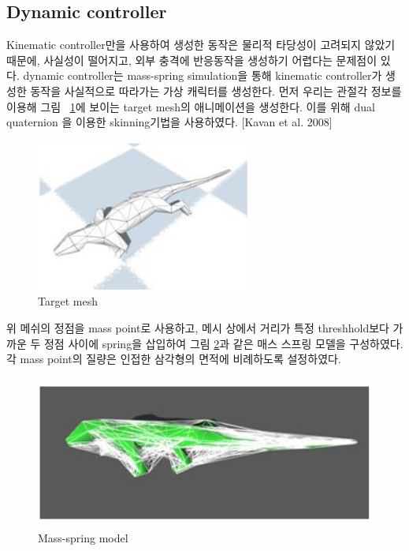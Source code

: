 \documentclass[11pt,a4paper]{article}
\begin{document}
\subsection{Dynamic controller}
Kinematic controller만을 사용하여 생성한 동작은 물리적 타당성이 고려되지 않았기 때문에, 사실성이 떨어지고, 외부 충격에 반응동작을 생성하기 어렵다는 문제점이 있다. dynamic controller는 mass-spring simulation을 통해 kinematic controller가 생성한 동작을 사실적으로 따라가는 가상 캐릭터를 생성한다. 먼저 우리는 관절각 정보를 이용해 그림 ~\ref{target}에 보이는 target mesh의 애니메이션을 생성한다. 이를 위해 dual quaternion 을 이용한 skinning기법을 사용하였다. [Kavan et al. 2008]
                             
\begin{figure}[h]
\center
\includegraphics[height=5cm]{figures/target.jpg}
\caption{Target mesh\label{target}}
\end{figure}

                                 
위 메쉬의 정점을 mass point로 사용하고, 메시 상에서 거리가 특정 threshhold보다 가까운 두 정점 사이에 spring을 삽입하여 그림 \ref{model}과 같은 매스 스프링 모델을 구성하였다. 각 mass point의 질량은 인접한 삼각형의 면적에 비례하도록 설정하였다.
          

\begin{figure}[h]
\center
\includegraphics[height=5cm]{figures/model.jpg}
\caption{Mass-spring model\label{model}}
\end{figure}
		  
\end{document}
